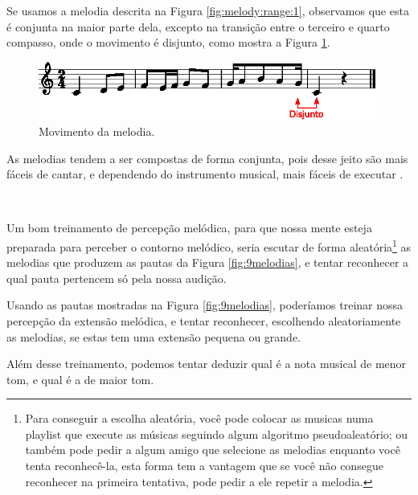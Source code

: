 \begin{description}
\begin{example}
Se usamos a melodia descrita na Figura \ref{fig:melody:range:1},
observamos que esta é conjunta na maior parte dela,
excepto na transição entre o terceiro e quarto compasso,
onde o movimento é disjunto,
como mostra a Figura \ref{fig:melody:movement:1}.
\end{example}
\begin{figure}[!h]
\centering
\includegraphics[width=0.99\textwidth]{chapters/cap-musicalidade-percepcion/melodia-carateristicas-movement.eps}
\caption{Movimento da melodia.}
\label{fig:melody:movement:1}
\end{figure}

As melodias tendem a ser compostas de forma conjunta, 
pois desse jeito são mais fáceis de cantar,
e dependendo do instrumento musical, mais fáceis de executar  
\cite[pp. 53]{langer2017theory}. 

\end{description}~




\begin{example}
Um bom treinamento de percepção melódica,
para que nossa mente esteja preparada para perceber o contorno melódico,
seria escutar de forma aleatória\footnote{Para conseguir a escolha aleatória,
você pode colocar as musicas numa playlist que execute as músicas 
seguindo algum algoritmo pseudoaleatório;
ou também pode pedir a algum amigo que selecione as melodias enquanto você tenta reconhecê-la,
esta forma tem a vantagem que se você não consegue reconhecer na primeira tentativa,
pode pedir a ele repetir a melodia.} 
as melodias que produzem as pautas da Figura \ref{fig:9melodias},
e tentar reconhecer a qual pauta pertencem só pela nossa audição.
\end{example}


\begin{example}
Usando as  pautas mostradas na Figura \ref{fig:9melodias},
poderíamos treinar nossa percepção da extensão melódica,
e tentar reconhecer, escolhendo aleatoriamente as melodias, 
se estas tem uma extensão pequena ou grande.

Além desse treinamento, podemos tentar deduzir qual é a nota musical de menor tom, 
e qual é a de maior tom.
\end{example}


